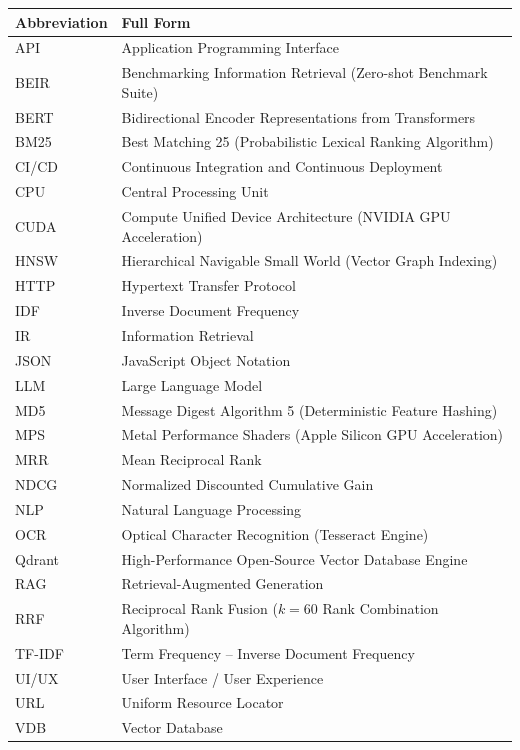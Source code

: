 \documentclass[a4paper,12pt]{article}
\begin{document}
\noindent
\renewcommand{\arraystretch}{1.2}
\begin{longtable}{|l|p{10.5cm}|}
\hline
\rowcolor{gray!15} \textbf{Abbreviation} & \textbf{Full Form} \\ \hline
\endhead
API     & Application Programming Interface \\ \hline
BEIR    & Benchmarking Information Retrieval (Zero-shot Benchmark Suite) \\ \hline
BERT    & Bidirectional Encoder Representations from Transformers \\ \hline
BM25    & Best Matching 25 (Probabilistic Lexical Ranking Algorithm) \\ \hline
CI/CD   & Continuous Integration and Continuous Deployment \\ \hline
CPU     & Central Processing Unit \\ \hline
CUDA    & Compute Unified Device Architecture (NVIDIA GPU Acceleration) \\ \hline
HNSW    & Hierarchical Navigable Small World (Vector Graph Indexing) \\ \hline
HTTP    & Hypertext Transfer Protocol \\ \hline
IDF     & Inverse Document Frequency \\ \hline
IR      & Information Retrieval \\ \hline
JSON    & JavaScript Object Notation \\ \hline
LLM     & Large Language Model \\ \hline
MD5     & Message Digest Algorithm 5 (Deterministic Feature Hashing) \\ \hline
MPS     & Metal Performance Shaders (Apple Silicon GPU Acceleration) \\ \hline
MRR     & Mean Reciprocal Rank \\ \hline
NDCG    & Normalized Discounted Cumulative Gain \\ \hline
NLP     & Natural Language Processing \\ \hline
OCR     & Optical Character Recognition (Tesseract Engine) \\ \hline
Qdrant  & High-Performance Open-Source Vector Database Engine \\ \hline
RAG     & Retrieval-Augmented Generation \\ \hline
RRF     & Reciprocal Rank Fusion ($k = 60$ Rank Combination Algorithm) \\ \hline
TF-IDF  & Term Frequency -- Inverse Document Frequency \\ \hline
UI/UX   & User Interface / User Experience \\ \hline
URL     & Uniform Resource Locator \\ \hline
VDB     & Vector Database \\ \hline
\end{longtable}
\clearpage
\end{document}
